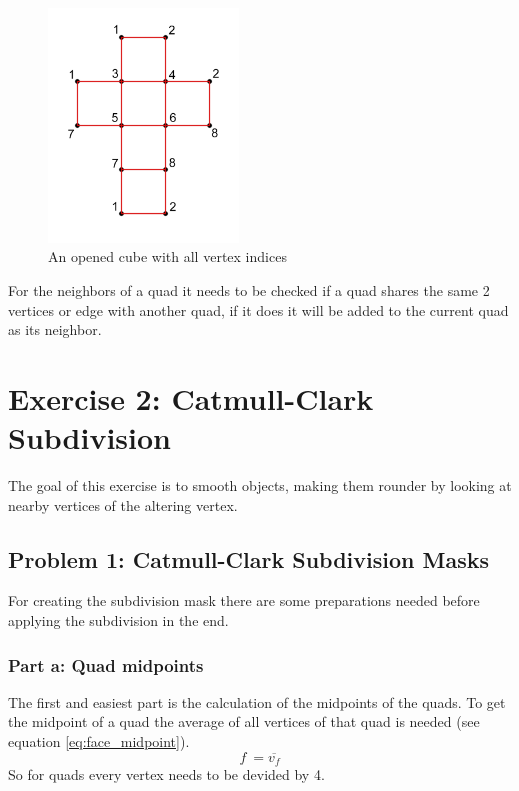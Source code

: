 \documentclass[11.5pt,oneside,a4paper]{scrartcl}
\newcounter{ct}
\begin{document}
\begin{figure}
	\includegraphics[width=0.45\textwidth]{cube.png}
	\caption{An opened cube with all vertex indices}
	\label{fig:cube}
\end{figure}

For the neighbors of a quad it needs to be checked if a quad shares the same 2 vertices or edge with another quad, if it does it will be added to the current quad as its neighbor.

\section{Exercise 2: Catmull-Clark Subdivision}
The goal of this exercise is to smooth objects, making them rounder by looking at nearby vertices of the altering vertex.

\subsection{Problem 1: Catmull-Clark Subdivision Masks}
For creating the subdivision mask there are some preparations needed before applying the subdivision in the end.

\subsubsection{Part a: Quad midpoints}
The first and easiest part is the calculation of the midpoints of the quads. To get the midpoint of a quad the average of all vertices of that quad is needed (see equation \ref{eq:face_midpoint}).
\begin{equation} \label{eq:face_midpoint}
        f \ = \overline{v_{f}}
\end{equation} 
So for quads every vertex needs to be devided by 4.
\end{document}
